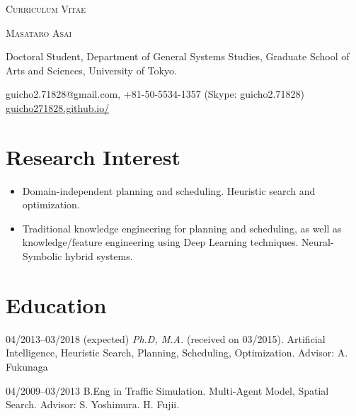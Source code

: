 \documentclass[letterpaper,11pt]{article}
\begin{document}
\pagestyle{empty}

\begin{center}
{\huge\textsc{Curriculum Vitae}}
\vspace{0.7\baselineskip}

{\Large\textsc{Masataro Asai}}
\vspace{0.5\baselineskip}

\small
{
Doctoral Student, Department of General Systems Studies,
Graduate School of Arts and Sciences, University of Tokyo.
}


 guicho2.71828@gmail.com, +81-50-5534-1357 (Skype: guicho2.71828) \url{guicho271828.github.io/}
\end{center}

\section{Research Interest}

\begin{itemize}
 \item Domain-independent planning and scheduling. Heuristic search and optimization.
 \item Traditional knowledge engineering for planning and scheduling, as well as knowledge/feature engineering using Deep Learning techniques. Neural-Symbolic hybrid systems.
\end{itemize}

\section{Education}

\begin{CV}
 \item[04/2013--03/2018] (expected) \textit{Ph.D, M.A.} (received on 03/2015).
 Artificial Intelligence, Heuristic Search, Planning, Scheduling, Optimization.
 {\small %
 Advisor: A. Fukunaga}

 \item[04/2009--03/2013] B.Eng in Traffic Simulation.
 Multi-Agent Model, Spatial Search.
 {\small %
 Advisor: S. Yoshimura. H. Fujii.}
\end{CV}
\end{document}
